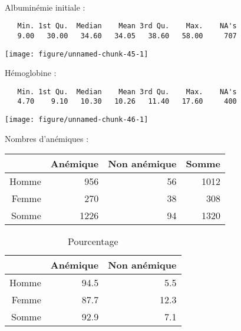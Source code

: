 \documentclass[11pt,a4paper]{article}\usepackage[]{graphicx}\usepackage[]{color}
\makeatletter
\def\maxwidth{ %
  \ifdim\Gin@nat@width>\linewidth
    \linewidth
  \else
    \Gin@nat@width
  \fi
}
\newenvironment{kframe}{%
 \def\at@end@of@kframe{}%
 \ifinner\ifhmode%
  \def\at@end@of@kframe{\end{minipage}}%
  \begin{minipage}{\columnwidth}%
 \fi\fi%
 \def\FrameCommand##1{\hskip\@totalleftmargin \hskip-\fboxsep
 \colorbox{shadecolor}{##1}\hskip-\fboxsep
     \hskip-\linewidth \hskip-\@totalleftmargin \hskip\columnwidth}%
 \MakeFramed {\advance\hsize-\width
   \@totalleftmargin\z@ \linewidth\hsize
   \@setminipage}}%
 {\par\unskip\endMakeFramed%
 \at@end@of@kframe}
\newenvironment{knitrout}{}{} %
\makeatother
\begin{document}
~\\

Albuminémie initiale :


\begin{knitrout}
\color{fgcolor}\begin{kframe}
\begin{verbatim}
   Min. 1st Qu.  Median    Mean 3rd Qu.    Max.    NA's 
   9.00   30.00   34.60   34.05   38.60   58.00     707 
\end{verbatim}
\end{kframe}
\texttt{[image: figure/unnamed-chunk-45-1]} 

\end{knitrout}

Hémoglobine :

\begin{knitrout}
\color{fgcolor}\begin{kframe}
\begin{verbatim}
   Min. 1st Qu.  Median    Mean 3rd Qu.    Max.    NA's 
   4.70    9.10   10.30   10.26   11.40   17.60     400 
\end{verbatim}
\end{kframe}
\texttt{[image: figure/unnamed-chunk-46-1]} 

\end{knitrout}

Nombres d'anémiques :

\begin{table}[ht]
\centering
\begin{tabular}{rrrr}
  \hline
 & Anémique & Non anémique & Somme \\ 
  \hline
Homme & 956 & 56 & 1012 \\ 
  Femme & 270 & 38 & 308 \\ 
  Somme & 1226 & 94 & 1320 \\ 
   \hline
\end{tabular}
\end{table}
\begin{table}[ht]
\centering
\begin{tabular}{rrr}
  \hline
 & Anémique & Non anémique \\ 
  \hline
Homme & 94.5 & 5.5 \\ 
  Femme & 87.7 & 12.3 \\ 
  Somme & 92.9 & 7.1 \\ 
   \hline
\end{tabular}
\caption{Pourcentage} 
\end{table}
\end{document}
